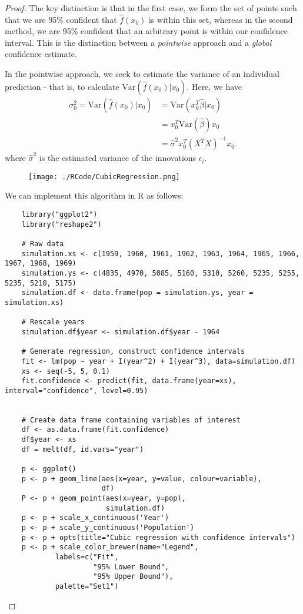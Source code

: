 \documentclass[12pt]{amsart}
\theoremstyle{plain}%
\theoremstyle{definition}
\theoremstyle{remark}
\begin{document}
\begin{proof}
    The key distinction is that in the first case, we form the set of points such that we are 95\% confident that $\hat f(x_0)$ is within this set, whereas in the second method, we are 95\% confident that an arbitrary point is within our confidence interval.  This is the distinction between a \emph{pointwise} approach and a \emph{global} confidence estimate. 
    
    In the pointwise approach, we seek to estimate the variance of an individual prediction - that is, to calculate $\text{Var}(\hat f(x_0) | x_0)$.  Here, we have \begin{align*}
        \sigma_0^2 = \text{Var}(\hat f(x_0) | x_0) &= \text{Var}(x_0^T \hat \beta | x_0) \\
                                    &= x_0^T \text{Var}(\hat \beta) x_0 \\
                                    &= \hat \sigma^2 x_0^T (X^T X)^{-1} x_0.
    \end{align*} where $\hat \sigma^2$ is the estimated variance of the innovations $\epsilon_i$.
    
    
    \begin{figure}
	\centering\texttt{[image: ./RCode/CubicRegression.png]}
    \end{figure}

    We can implement this algorithm in R as follows:
\clearpage
\begin{lstlisting}
    library("ggplot2")
    library("reshape2")

    # Raw data
    simulation.xs <- c(1959, 1960, 1961, 1962, 1963, 1964, 1965, 1966, 1967, 1968, 1969)
    simulation.ys <- c(4835, 4970, 5085, 5160, 5310, 5260, 5235, 5255, 5235, 5210, 5175)
    simulation.df <- data.frame(pop = simulation.ys, year = simulation.xs)

    # Rescale years
    simulation.df$year <- simulation.df$year - 1964

    # Generate regression, construct confidence intervals
    fit <- lm(pop ~ year + I(year^2) + I(year^3), data=simulation.df)
    xs <- seq(-5, 5, 0.1)
    fit.confidence <- predict(fit, data.frame(year=xs), interval="confidence", level=0.95)


    # Create data frame containing variables of interest
    df <- as.data.frame(fit.confidence)
    df$year <- xs
    df = melt(df, id.vars="year")

    p <- ggplot()
    p <- p + geom_line(aes(x=year, y=value, colour=variable),
                       df)
    P <- p + geom_point(aes(x=year, y=pop), 
                        simulation.df)
    p <- p + scale_x_continuous('Year') 
    p <- p + scale_y_continuous('Population')
    p <- p + opts(title="Cubic regression with confidence intervals")
    p <- p + scale_color_brewer(name="Legend",
            labels=c("Fit", 
                     "95% Lower Bound", 
                     "95% Upper Bound"), 
            palette="Set1")
\end{lstlisting}

\end{proof}
\end{document}
